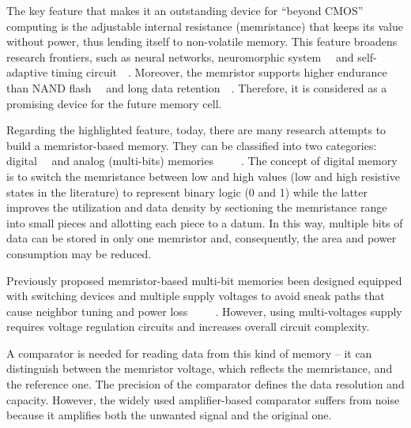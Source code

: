 \documentclass[twocolumn,conference]{IEEEtran}
\begin{document}
The key feature that makes it an outstanding device for ``beyond CMOS'' computing is the adjustable internal resistance (memristance) that keeps its value without power, thus lending itself to non-volatile memory. This feature broadens research frontiers, such as neural networks, neuromorphic system~\cite{Vourkas-2016-MCAS}~\cite{Tetzlaff-2014-Springer} and self-adaptive timing circuit~\cite{Gu-2015-ISCAS}~\cite{Bunnam-2017-PATMOS}.
Moreover, the memristor supports higher endurance than NAND flash~\cite{ITRS-2015}~\cite{Yang-2013-Nature} and long data retention~\cite{Tetzlaff-2014-Springer}~\cite{ITRS-2015}. Therefore, it is considered as a promising device for the future memory cell.

Regarding the highlighted feature, today, there are many research attempts to build a memristor-based memory. They can be classified into two categories: digital~\cite{Emara-2014-CEEC}~\cite{Elshamy-2015-TVLSI} and analog (multi-bits) memories~\cite{Emara-2014-CEEC}~\cite{Manem-2011-ISCAS}~\cite{Soell-2017-CTA}~\cite{Wang-2017-TCAD}~\cite{Yilmaz-2017-TNano}. The concept of digital memory is to switch the memristance between low and high values (low and high resistive states in the literature) to represent binary logic (0 and 1) while the latter improves the utilization and data density by sectioning the memristance range into small pieces and allotting each piece to a datum. In this way, multiple bits of data can be stored in only one memristor and, consequently, the area and power consumption may be reduced.

Previously proposed memristor-based multi-bit memories been designed equipped with switching devices and multiple supply voltages to avoid sneak paths that cause neighbor tuning and power loss~\cite{Emara-2014-CEEC}~\cite{Manem-2011-ISCAS}~\cite{Soell-2017-CTA}~\cite{Wang-2017-TCAD}~\cite{Yilmaz-2017-TNano}. However, using multi-voltages supply requires voltage regulation circuits and increases overall circuit complexity.

A comparator is needed for reading data from this kind of memory -- it can distinguish between the memristor voltage, which reflects the memristance, and the reference one. The precision of the comparator defines the data resolution and capacity. However, the widely used amplifier-based comparator suffers from noise because it amplifies both the unwanted signal and the original one.
\end{document}
